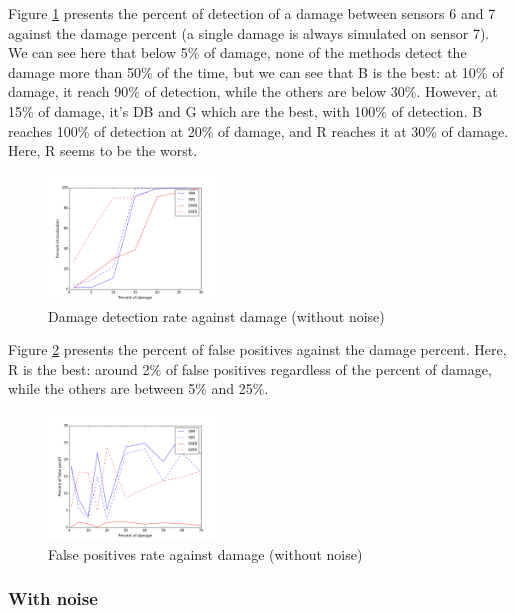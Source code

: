 \documentclass[journal]{IEEEtran}
\begin{document}
Figure \ref{detect} presents the percent of detection of a damage between sensors 6 and 7 against the damage percent (a single damage is always simulated on sensor 7). We can see here that below 5\% of damage, none of the methods detect the damage more than 50\% of the time, but we can see that B is the best: at 10\% of damage, it reach 90\% of detection, while the others are below 30\%. However, at 15\% of damage, it's DB and G which are the best, with 100\% of detection. B reaches 100\% of detection at 20\% of damage, and R reaches it at 30\% of damage. Here, R seems to be the worst.

\begin{figure}[h!]
  \centering
  \includegraphics[width=0.4\textwidth]{images/detect.png}
  \caption{Damage detection rate against damage (without noise)}
  \label{detect}
\end{figure}


Figure \ref{fp} presents the percent of false positives against the damage percent. Here, R is the best: around 2\% of false positives regardless of the percent of damage, while the others are between 5\% and 25\%.


\begin{figure}[h!]
  \centering
  \includegraphics[width=0.4\textwidth]{images/fp.png}
  \caption{False positives rate against damage (without noise)}
  \label{fp}
\end{figure}



\subsubsection{With noise}
\end{document}
